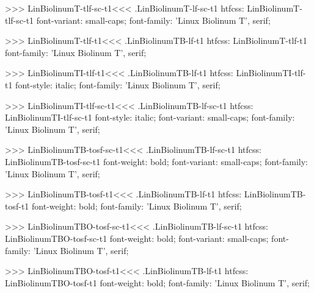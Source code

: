 {{{{{{{>>>
\<LinBiolinumT-tlf-sc-t1\><<<
.LinBiolinumT-lf-sc-t1
htfcss:  LinBiolinumT-tlf-sc-t1  font-variant: small-caps; font-family: 'Linux Biolinum T', serif;

>>>
\<LinBiolinumT-tlf-t1\><<<
.LinBiolinumTB-lf-t1
htfcss:  LinBiolinumT-tlf-t1  font-family: 'Linux Biolinum T', serif;

>>>
\<LinBiolinumTI-tlf-t1\><<<
.LinBiolinumTB-lf-t1
htfcss:  LinBiolinumTI-tlf-t1  font-style: italic; font-family: 'Linux Biolinum T', serif;

>>>
\<LinBiolinumTI-tlf-sc-t1\><<<
.LinBiolinumTB-lf-sc-t1
htfcss:  LinBiolinumTI-tlf-sc-t1  font-style: italic; font-variant: small-caps; font-family: 'Linux Biolinum T', serif;

>>>
\<LinBiolinumTB-tosf-sc-t1\><<<
.LinBiolinumTB-lf-sc-t1
htfcss:  LinBiolinumTB-tosf-sc-t1  font-weight: bold; font-variant: small-caps; font-family: 'Linux Biolinum T', serif;

>>>
\<LinBiolinumTB-tosf-t1\><<<
.LinBiolinumTB-lf-t1
htfcss:  LinBiolinumTB-tosf-t1  font-weight: bold; font-family: 'Linux Biolinum T', serif;

>>>
\<LinBiolinumTBO-tosf-sc-t1\><<<
.LinBiolinumTB-lf-sc-t1
htfcss:  LinBiolinumTBO-tosf-sc-t1  font-weight: bold; font-variant: small-caps; font-family: 'Linux Biolinum T', serif;

>>>
\<LinBiolinumTBO-tosf-t1\><<<
.LinBiolinumTB-lf-t1
htfcss:  LinBiolinumTBO-tosf-t1  font-weight: bold; font-family: 'Linux Biolinum T', serif;

}}}}}}}
